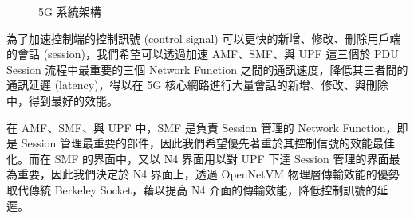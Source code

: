 \begin{figure}[ht]
  \centering
  \caption[5G 系統架構]{{\footnotesize 5G 系統架構~\cite{3gpp.23.501}}}
  \label{fig:5g_system_architecture}
\end{figure}


為了加速控制端的控制訊號 (control signal) 可以更快的新增、修改、刪除用戶端的會話 (session)，我們希望可以透過加速 AMF、SMF、與 UPF 這三個於 PDU Session 流程中最重要的三個 Network Function 之間的通訊速度，降低其三者間的通訊延遲 (latency)，得以在 5G 核心網路進行大量會話的新增、修改、與刪除中，得到最好的效能。

在 AMF、SMF、與 UPF 中，SMF 是負責 Session 管理的 Network Function，即是 Session 管理最重要的部件，因此我們希望優先著重於其控制信號的效能最佳化。而在 SMF 的界面中，又以 N4 界面用以對 UPF 下達 Session 管理的界面最為重要，因此我們決定於 N4 界面上，透過 OpenNetVM 物理層傳輸效能的優勢取代傳統 Berkeley Socket，藉以提高 N4 介面的傳輸效能，降低控制訊號的延遲。



